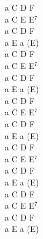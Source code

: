 \documentclass[a5paper, 10pt]{book}
\begin{document}
\begin{minipage}[t]{0.2\textwidth}
  a C D F\\
  a C E E$^7$\\
  a C D F\\
  a E a (E)\\

  a C D F\\
  a C E E$^7$\\
  a C D F\\
  a E a (E)\\

  a C D F\\
  a C E E$^7$\\
  a C D F\\
  a E a (E)\\

  a C D F\\
  a C E E$^7$\\
  a C D F\\
  a E a (E)\\

  a C D F\\
  a C E E$^7$\\
  a C D F\\
  a E a (E)\\
\end{minipage}

\newpage
\end{document}
